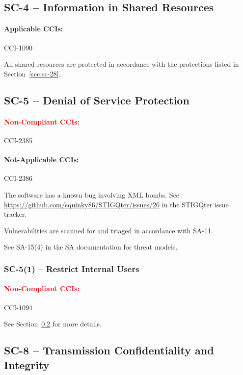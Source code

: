 \documentclass[letterpaper, 10pt, twoside]{article}
\begin{document}
\subsection{SC-4 -- Information in Shared Resources}

\paragraph{Applicable CCIs:} CCI-1090

All shared resources are protected in accordance with the protections listed in Section~\ref{sec:sc-28}.

\subsection{SC-5 -- Denial of Service Protection}
\label{sec:sc-5}

\paragraph{\textcolor{red}{Non-Compliant CCIs:}} CCI-2385

\paragraph{Not-Applicable CCIs:} CCI-2386

The software has a known bug involving XML bombs. See \href{Issue #26}{https://github.com/squinky86/STIGQter/issues/26} in the STIGQter issue tracker.

Vulnerabilities are scanned for and triaged in accordance with SA-11.

See SA-15(4) in the SA documentation for threat models.

\subsubsection{SC-5(1) -- Restrict Internal Users}

\paragraph{\textcolor{red}{Non-Compliant CCIs:}} CCI-1094

See Section~\ref{sec:sc-5} for more details.

\subsection{SC-8 -- Transmission Confidentiality and Integrity}
\label{sec:sc-8}
\end{document}
